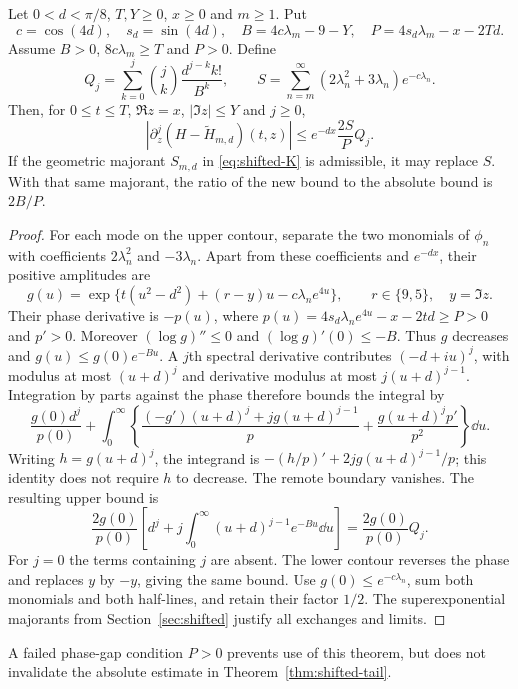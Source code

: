 \begin{theorem}\label{thm:nonstationary}
Let $0<d<\pi/8$, $T,Y\ge0$, $x\ge0$ and $m\ge1$. Put
\[
 c=\cos(4d),\quad s_d=\sin(4d),\quad
 B=4c\lambda_m-9-Y,\quad P=4s_d\lambda_m-x-2Td.
\]
Assume $B>0$, $8c\lambda_m\ge T$ and $P>0$. Define
\[
 Q_j=\sum_{k=0}^j\binom jk\frac{d^{j-k}k!}{B^k},\qquad
 S=\sum_{n=m}^\infty(2\lambda_n^2+3\lambda_n)e^{-c\lambda_n}.
\]
Then, for $0\le t\le T$, $\Re z=x$, $|\Im z|\le Y$ and $j\ge0$,
\begin{equation}\label{eq:nonstationary}
 \left|\partial_z^j(H-\widetilde H_{m,d})(t,z)\right|
 \le e^{-dx}\frac{2S}{P}Q_j.
\end{equation}
If the geometric majorant $S_{m,d}$ in \eqref{eq:shifted-K} is
admissible, it may replace $S$. With that same majorant, the ratio
of the new bound to the absolute bound is $2B/P$.
\end{theorem}
\begin{proof}
For each mode on the upper contour, separate the two monomials of
$\phi_n$ with coefficients $2\lambda_n^2$ and $-3\lambda_n$.
Apart from these coefficients and $e^{-dx}$, their positive amplitudes are
\[
 g(u)=\exp\{t(u^2-d^2)+(r-y)u-c\lambda_ne^{4u}\},
 \qquad r\in\{9,5\},\quad y=\Im z.
\]
Their phase derivative is $-p(u)$, where
$p(u)=4s_d\lambda_ne^{4u}-x-2td\ge P>0$ and $p'>0$.
Moreover $(\log g)''\le0$ and $(\log g)'(0)\le-B$.
Thus $g$ decreases and $g(u)\le g(0)e^{-Bu}$.
A $j$th spectral derivative contributes $(-d+iu)^j$, with
modulus at most $(u+d)^j$ and derivative modulus at most
$j(u+d)^{j-1}$. Integration by parts against the phase therefore bounds
the integral by
\[
 \frac{g(0)d^j}{p(0)}
 +\int_0^\infty\left\{
 \frac{(-g')(u+d)^j+jg(u+d)^{j-1}}p+
 \frac{g(u+d)^jp'}{p^2}\right\}\dd u.
\]
Writing $h=g(u+d)^j$, the integrand is
$-(h/p)'+2jg(u+d)^{j-1}/p$; this identity does not require $h$
to decrease. The remote boundary vanishes. The resulting upper bound is
\[
 \frac{2g(0)}{p(0)}
 \left[d^j+j\int_0^\infty(u+d)^{j-1}e^{-Bu}\dd u\right]
 =\frac{2g(0)}{p(0)}Q_j.
\]
For $j=0$ the terms containing $j$ are absent. The lower contour
reverses the phase and replaces $y$ by $-y$, giving the same bound.
Use $g(0)\le e^{-c\lambda_n}$, sum both monomials and both
half-lines, and retain their factor $1/2$. The superexponential
majorants from Section~\ref{sec:shifted} justify all exchanges and limits.
\end{proof}

A failed phase-gap condition $P>0$ prevents use of this theorem,
but does not invalidate the absolute estimate in
Theorem~\ref{thm:shifted-tail}.

